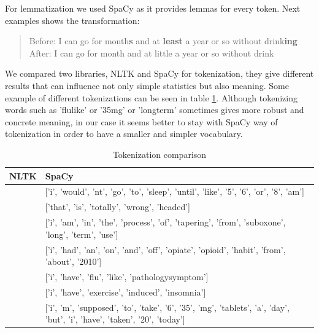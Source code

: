 \documentclass[11pt]{article}
\begin{document}
For lemmatization we used SpaCy as it provides lemmas for every token. Next examples shows the transformation:

\begin{quote}
Before: 	I can go for month\textbf{s} and at \textbf{least} a year or so without drink\textbf{ing} \\
After: 		I can go for month and at little a year or so without drink
\end{quote}

We compared two libraries, NLTK and SpaCy for tokenization, they give different results that can influence not only simple statistics but also meaning. Some example of different tokenizations can be seen in table \ref{token_dif}. Although tokenizing  words such as 'flulike' or '35mg' or 'longterm' sometimes gives more robust and concrete meaning, in our case it seems better to stay with SpaCy way of tokenization in order to have a smaller and simpler vocabulary.

\begin{center}
\begin{table}
\begin{tabular}{ |p{7cm}|p{7cm}| }
\hline
NLTK & SpaCy \\ \hline
['i', 'wouldnt', 'go', 'to', 'sleep', 'until', 'like', '5', '6', 'or', '8am'] & 
['i', 'would', 'nt', 'go', 'to', 'sleep', 'until', 'like', '5', '6', 'or', '8', 'am'] \\ \hline
['that', 'is', 'totally', 'wrongheaded'] & ['that', 'is', 'totally', 'wrong', 'headed'] \\ \hline
['i', 'am', 'in', 'the', 'process', 'of', 'tapering', 'from', 'suboxone', 'longterm', 'use'] & 
['i', 'am', 'in', 'the', 'process', 'of', 'tapering', 'from', 'suboxone', 'long', 'term', 'use'] \\ \hline
['i', 'had', 'an', 'onandoff', 'opiateopioid', 'habit', 'from', 'about', '2010'] & 
['i', 'had', 'an', 'on', 'and', 'off', 'opiate', 'opioid', 'habit', 'from', 'about', '2010'] \\ 
\hline
['i', 'have', 'flulike', 'pathologysymptom'] & ['i', 'have', 'flu', 'like', 'pathologysymptom'] \\ \hline
['i', 'have', 'exerciseinduced', 'insomnia'] & ['i', 'have', 'exercise', 'induced', 'insomnia'] \\ \hline
['i', 'm', 'supposed', 'to', 'take', '6', '35mg', 'tablets', 'a', 'day', 'but', 'i', 'have', 'taken', '20', 'today'] & 
['i', 'm', 'supposed', 'to', 'take', '6', '35', 'mg', 'tablets', 'a', 'day', 'but', 'i', 'have', 'taken', '20', 'today'] \\ 
\hline
\end{tabular}	
\caption{Tokenization comparison}\label{token_dif}
\end{table}
\end{center}
\FloatBarrier
\end{document}
